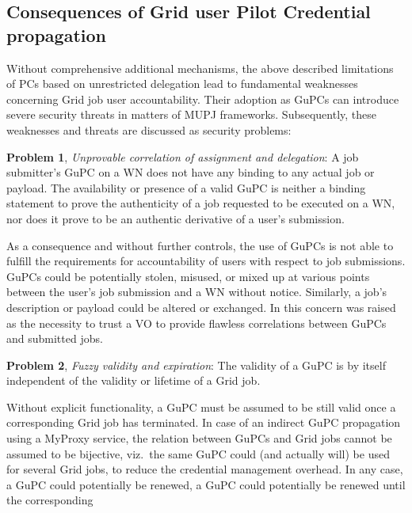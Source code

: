 \documentclass[10pt]{iopart}
\begin{document}
\subsection{Consequences of Grid user Pilot Credential propagation}
\label{problems}
Without comprehensive additional mechanisms, the above
described limitations of PCs based on unrestricted delegation
lead to fundamental
weaknesses concerning Grid job user accountability. Their adoption
as GuPCs can
introduce severe security
threats in matters of MUPJ frameworks. Subsequently,
these weaknesses and threats are discussed as security problems:\\
\par
\begingroup
\leftskip=0.4cm \noindent
\textbf{Problem 1}, \textit{Unprovable correlation of assignment and
delegation}: A job submitter's GuPC on a WN does not have any binding to any
actual job or payload. The availability or presence of a valid GuPC is neither a
binding statement to prove the authenticity of a job requested to be executed on
a WN, nor does it prove to be an authentic derivative of
a user's submission.\\
\par
\endgroup\noindent
As a consequence and without further controls, the use of GuPCs is not
able to fulfill the requirements
for accountability of users with respect to job submissions. GuPCs could be
potentially stolen, misused,
or mixed up at various points between the user's job submission
and a WN without notice. Similarly, 
a job's description or
payload could be altered or exchanged. In
 this concern was
raised as the necessity to trust a VO to provide flawless correlations between
GuPCs and submitted jobs.\\
\par
\begingroup
\leftskip=0.4cm
\noindent
\textbf{Problem 2}, \textit{Fuzzy validity and expiration}:
The validity of a GuPC is by itself independent of the validity or lifetime
of a Grid job.\\
\par
\endgroup\noindent
Without explicit functionality, a GuPC must be assumed to be
still valid once a corresponding Grid job has terminated. In case of an
indirect GuPC propagation using a MyProxy service, the relation
between GuPCs and Grid jobs cannot be assumed to be bijective, viz.\ the same
GuPC could (and actually will) be
used for several Grid jobs, to reduce the credential management overhead.
In any case, a GuPC could potentially be renewed, 
a GuPC could potentially be renewed until the corresponding
\end{document}
